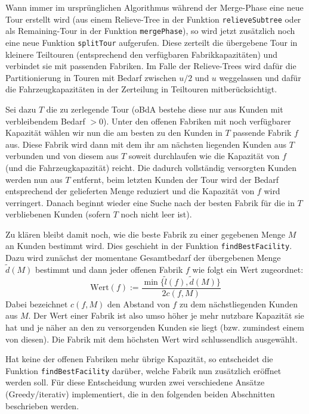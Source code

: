 \documentclass[a4paper,ngerman,11pt,bibtotoc]{scrartcl}
\theoremstyle{definition}
\theoremstyle{plain}
\theoremstyle{remark}
\begin{document}
	Wann immer im ursprünglichen Algorithmus während der Merge-Phase eine neue Tour erstellt wird (aus einem Relieve-Tree in der Funktion \lstinline|relieveSubtree| oder als Remaining-Tour in der Funktion \lstinline|mergePhase|), so wird jetzt zusätzlich noch eine neue Funktion \lstinline|splitTour| aufgerufen. Diese zerteilt die übergebene Tour in kleinere Teiltouren (entsprechend den verfügbaren Fabrikkapazitäten) und verbindet sie mit passenden Fabriken. Im Falle der Relieve-Trees wird dafür die Partitionierung in Touren mit Bedarf zwischen $u/2$ und $u$ weggelassen und dafür die Fahrzeugkapazitäten in der Zerteilung in Teiltouren mitberücksichtigt.
	
	Sei dazu $T$ die zu zerlegende Tour (oBdA bestehe diese nur aus Kunden mit verbleibendem Bedarf $>0$). Unter den offenen Fabriken mit noch verfügbarer Kapazität wählen wir nun die \glqq am besten\grqq{} zu den Kunden in $T$ passende Fabrik $f$ aus. Diese Fabrik wird dann mit dem ihr am nächsten liegenden Kunden aus $T$ verbunden und von diesem aus $T$ soweit durchlaufen wie die Kapazität von $f$ (und die Fahrzeugkapazität) reicht. Die dadurch vollständig versorgten Kunden werden nun aus $T$ entfernt, beim letzten Kunden der Tour wird der Bedarf entsprechend der gelieferten Menge reduziert und die Kapazität von $f$ wird verringert. Danach beginnt wieder eine Suche nach der \glqq besten Fabrik\grqq{} für die in $T$ verbliebenen Kunden (sofern $T$ noch nicht leer ist).
	
	Zu klären bleibt damit noch, wie die \glqq beste Fabrik\grqq{} zu einer gegebenen Menge $M$ an Kunden bestimmt wird. Dies geschieht in der Funktion \lstinline|findBestFacility|. Dazu wird zunächst der momentane Gesamtbedarf der übergebenen Menge $\tilde{d}(M)$ bestimmt und dann jeder offenen Fabrik $f$ wie folgt ein Wert zugeordnet:
	\[\text{Wert}(f) :=  \frac{\min\{\tilde{l}(f), \tilde{d}(M)\}}{2 c(f,M)}\]
	Dabei bezeichnet $c(f,M)$ den Abstand von $f$ zu dem nächstliegenden Kunden aus $M$. Der Wert einer Fabrik ist also umso höher je mehr nutzbare Kapazität sie hat und je näher an den zu versorgenden Kunden sie liegt (bzw. zumindest einem von diesen). Die Fabrik mit dem höchsten Wert wird schlussendlich ausgewählt.
	
	Hat keine der offenen Fabriken mehr übrige Kapazität, so entscheidet die Funktion \lstinline|findBestFacility| darüber, welche Fabrik nun zusätzlich eröffnet werden soll. Für diese Entscheidung wurden zwei verschiedene Ansätze (\glqq Greedy\grqq/\glqq iterativ\grqq) implementiert, die in den folgenden beiden Abschnitten beschrieben werden.		
\end{document}
